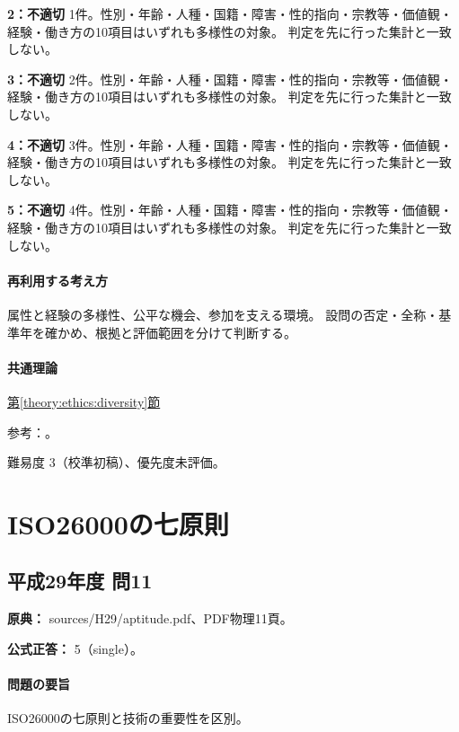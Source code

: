 \noindent\textbf{2：不適切} 1件。性別・年齢・人種・国籍・障害・性的指向・宗教等・価値観・経験・働き方の10項目はいずれも多様性の対象。 判定を先に行った集計と一致しない。\par

\noindent\textbf{3：不適切} 2件。性別・年齢・人種・国籍・障害・性的指向・宗教等・価値観・経験・働き方の10項目はいずれも多様性の対象。 判定を先に行った集計と一致しない。\par

\noindent\textbf{4：不適切} 3件。性別・年齢・人種・国籍・障害・性的指向・宗教等・価値観・経験・働き方の10項目はいずれも多様性の対象。 判定を先に行った集計と一致しない。\par

\noindent\textbf{5：不適切} 4件。性別・年齢・人種・国籍・障害・性的指向・宗教等・価値観・経験・働き方の10項目はいずれも多様性の対象。 判定を先に行った集計と一致しない。\par

\paragraph{再利用する考え方} 属性と経験の多様性、公平な機会、参加を支える環境。 設問の否定・全称・基準年を確かめ、根拠と評価範囲を分けて判断する。

\paragraph{共通理論} \hyperref[theory:ethics:diversity]{第\ref*{theory:ethics:diversity}節}

\par 参考：\cite{eth54_dei2025}。

\par 難易度 3（校準初稿）、優先度未評価。

\section{ISO26000の七原則}

\subsection{平成29年度 問11}
\label{q:h29-reg-apt-11}

\noindent\textbf{原典：} sources/H29/aptitude.pdf、PDF物理11頁。

\textbf{公式正答：} 5（single）。

\paragraph{問題の要旨} ISO26000の七原則と技術の重要性を区別。

